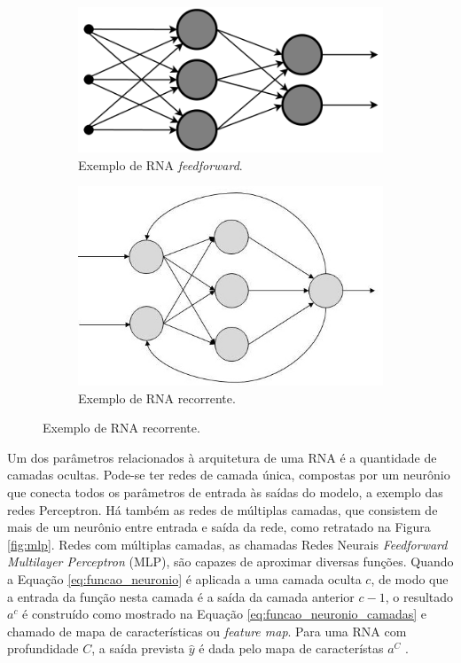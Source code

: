 \begin{figure}[h!]
	\caption{Exemplos de RNA com diferentes tipos de conexões entre neurônios.}
	\label{fig:rna_conectividade}
	\begin{subfigure}[h]{0.45\linewidth}
		\caption{Exemplo de RNA \emph{feedforward}.}
		\label{fig:feedforward}
		\includegraphics[width=\linewidth]{img/feedforward}
	\end{subfigure}
	\hfill
	\begin{subfigure}[h]{0.35\linewidth}
		\caption{Exemplo de RNA recorrente.}
		\label{fig:recorrente}
		\includegraphics[width=\linewidth]{img/recorrente2}
	\end{subfigure}%
\end{figure}

Um dos parâmetros relacionados à arquitetura de uma RNA é a quantidade de camadas ocultas. Pode-se ter redes de camada única, compostas por um neurônio que conecta todos os parâmetros de entrada às saídas do modelo, a exemplo das redes Perceptron. Há também as redes de múltiplas camadas, que consistem de mais de um neurônio entre entrada e saída da rede, como retratado na Figura \ref{fig:mlp}. Redes com múltiplas camadas, as chamadas Redes Neurais \emph{Feedforward Multilayer Perceptron} (MLP), são capazes de aproximar diversas funções. Quando a Equação \ref{eq:funcao_neuronio} é aplicada a uma camada oculta $c$, de modo que a entrada da função nesta camada é a saída da camada anterior $c-1$, o resultado $a^{c}$ é construído como mostrado na Equação \ref{eq:funcao_neuronio_camadas} e chamado de mapa de características ou \emph{feature map}. Para uma RNA com profundidade $C$, a saída prevista $\hat{y}$
é dada pelo mapa de característas $a^C$ \cite{hornik1991approximation,Teresa:Livro}.

